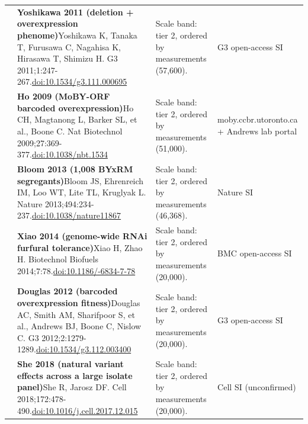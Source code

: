 \begin{landscape}
\begin{longtable}{@{}r@{\hspace{4pt}} L{86mm} L{92mm} L{62mm}@{}}
 & \textbf{Yoshikawa 2011 (deletion + overexpression phenome)}\newline Yoshikawa K, Tanaka T, Furusawa C, Nagahisa K, Hirasawa T, Shimizu H. G3 2011;1:247-267.\newline \href{https://doi.org/10.1534/g3.111.000695}{doi:10.1534/\allowbreak g3.111.000695} & Scale band: tier 2, ordered by measurements (57,600). & G3 open-access SI \\
 & \textbf{Ho 2009 (MoBY-ORF barcoded overexpression)}\newline Ho CH, Magtanong L, Barker SL, et al., Boone C. Nat Biotechnol 2009;27:369-377.\newline \href{https://doi.org/10.1038/nbt.1534}{doi:10.1038/\allowbreak nbt.1534} & Scale band: tier 2, ordered by measurements (51,000). & moby.ccbr.utoronto.ca + Andrews lab portal \\
 & \textbf{Bloom 2013 (1,008 BYxRM segregants)}\newline Bloom JS, Ehrenreich IM, Loo WT, Lite TL, Kruglyak L. Nature 2013;494:234-237.\newline \href{https://doi.org/10.1038/nature11867}{doi:10.1038/\allowbreak nature11867} & Scale band: tier 2, ordered by measurements (46,368). & Nature SI \\
 & \textbf{Xiao 2014 (genome-wide RNAi furfural tolerance)}\newline Xiao H, Zhao H. Biotechnol Biofuels 2014;7:78.\newline \href{https://doi.org/10.1186/1754-6834-7-78}{doi:10.1186/-6834-7-78} & Scale band: tier 2, ordered by measurements (20,000). & BMC open-access SI \\
 & \textbf{Douglas 2012 (barcoded overexpression fitness)}\newline Douglas AC, Smith AM, Sharifpoor S, et al., Andrews BJ, Boone C, Nislow C. G3 2012;2:1279-1289.\newline \href{https://doi.org/10.1534/g3.112.003400}{doi:10.1534/\allowbreak g3.112.003400} & Scale band: tier 2, ordered by measurements (20,000). & G3 open-access SI \\
 & \textbf{She 2018 (natural variant effects across a large isolate panel)}\newline She R, Jarosz DF. Cell 2018;172:478-490.\newline \href{https://doi.org/10.1016/j.cell.2017.12.015}{doi:10.1016/\allowbreak j.cell.2017.12.015} & Scale band: tier 2, ordered by measurements (20,000). & Cell SI (unconfirmed) \\

\end{longtable}
\end{landscape}
